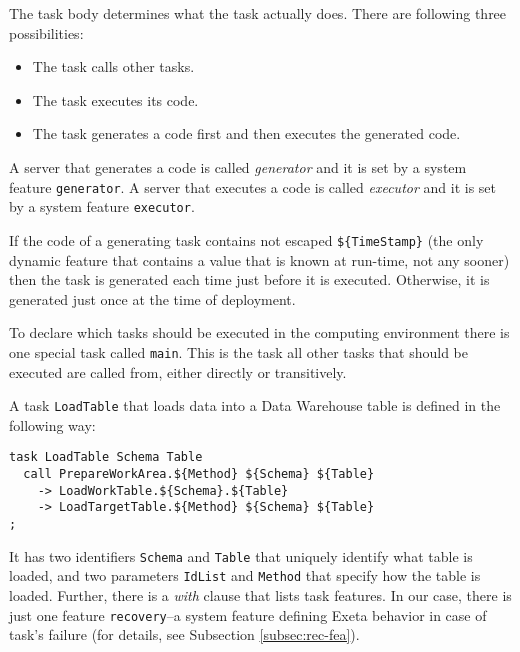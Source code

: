 \documentclass[a4paper,12pt,english,oneside]{book}
\newcommand{\exeta}{Exeta\xspace}
\begin{document}
The task body determines what the task actually does. There are following three possibilities:
\begin{itemize}
\item The task calls other tasks.
\item The task executes its code.
\item The task generates a code first and then executes the generated code.
\end{itemize}
A server that generates a code is called \emph{generator} and it is set by a system feature \verb|generator|.
A server that executes a code is called \emph{executor} and it is set by a system feature \verb|executor|.

If the code of a generating task contains not escaped \verb+${TimeStamp}+ (the only dynamic feature that contains a value that is known at run-time, not any sooner) then the task is generated each time just before it is executed. Otherwise, it is generated just once at the time of deployment.

To declare which tasks should be executed in the computing environment there is one special task called \verb|main|. This is the task all other tasks that should be executed are called from, either directly or transitively.

A task \verb|LoadTable| that loads data into a Data Warehouse table is defined in the following way:
\begin{verbatim}
task LoadTable Schema Table
  call PrepareWorkArea.${Method} ${Schema} ${Table}
    -> LoadWorkTable.${Schema}.${Table}
    -> LoadTargetTable.${Method} ${Schema} ${Table}
;
\end{verbatim}

It has two identifiers \verb|Schema| and \verb|Table| that unique\-ly identify what table is loaded, and two parameters \verb|IdList| and \verb|Method| that specify how the table is loaded.
Further, there is a \emph{with} clause that lists task features. In our case, there is just one feature \verb|recovery|--a system feature defining \exeta behavior in case of task's failure (for details, see Subsection \ref{subsec:rec-fea}).
\end{document}
